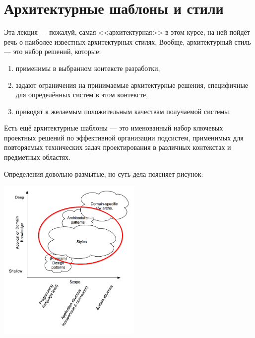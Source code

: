 \documentclass{../../text-style}
\begin{document}
\maketitle
\thispagestyle{empty}

\section{Архитектурные шаблоны и стили}

Эта лекция --- пожалуй, самая <<архитектурная>> в этом курсе, на ней пойдёт речь о наиболее известных архитектурных стилях. Вообще, архитектурный стиль --- это набор решений, которые:

\begin{enumerate}
    \item применимы в выбранном контексте разработки,
    \item задают ограничения на принимаемые архитектурные решения, специфичные для определённых систем в этом контексте,
    \item приводят к желаемым положительным качествам получаемой системы.
\end{enumerate}

Есть ещё архитектурные шаблоны --- это именованный набор ключевых проектных решений по эффективной организации подсистем, применимых для повторяемых технических задач проектирования в различных контекстах и предметных областях.

Определения довольно размытые, но суть дела поясняет рисунок:

\begin{center}
    \includegraphics[width=0.52\textwidth]{architecturalStylesHighlighted.png}
\end{center}
\end{document}
